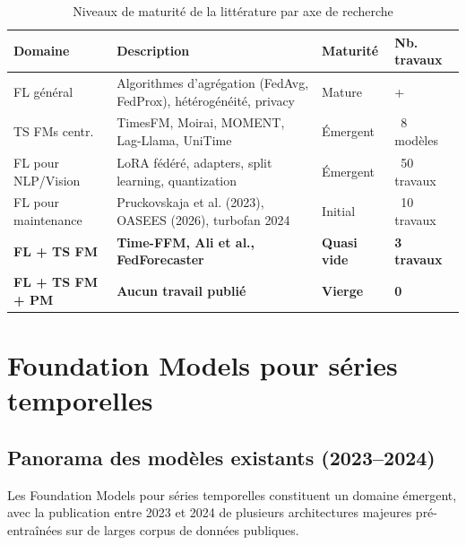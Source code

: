 \documentclass[12pt, a4paper]{report}
\begin{document}
\begin{table}[h!]
\centering
\caption{Niveaux de maturité de la littérature par axe de recherche}
\label{tab:maturity}
\renewcommand{\arraystretch}{1.6}
\begin{tabularx}{\textwidth}{>{\centering\arraybackslash}p{2.5cm}X>{\centering\arraybackslash}p{2cm}>{\centering\arraybackslash}p{2.5cm}}
\toprule
\textbf{Domaine} & \textbf{Description} & \textbf{Maturité} & \textbf{Nb. travaux} \\
\midrule
\rowcolor{mainblue!10}
FL général & Algorithmes d'agrégation (FedAvg, FedProx), hétérogénéité, privacy & Mature & 1000+ \\
\rowcolor{gaporange!10}
TS FMs centr. & TimesFM, Moirai, MOMENT, Lag-Llama, UniTime & Émergent & ~8 modèles \\
\rowcolor{gaporange!10}
FL pour NLP/Vision & LoRA fédéré, adapters, split learning, quantization & Émergent & ~50 travaux \\
\rowcolor{gapred!10}
FL pour maintenance & Pruckovskaja et al. (2023), OASEES (2026), turbofan 2024 & Initial & ~10 travaux \\
\rowcolor{gapred!20}
\textbf{FL + TS FM} & \textbf{Time-FFM, Ali et al., FedForecaster} & \textbf{Quasi vide} & \textbf{3 travaux} \\
\rowcolor{gapred!25}
\textbf{FL + TS FM + PM} & \textbf{Aucun travail publié} & \textbf{Vierge} & \textbf{0} \\
\bottomrule
\end{tabularx}
\end{table}

\section{Foundation Models pour séries temporelles}

\subsection{Panorama des modèles existants (2023--2024)}

Les Foundation Models pour séries temporelles constituent un domaine émergent, avec
la publication entre 2023 et 2024 de plusieurs architectures majeures pré-entraînées
sur de larges corpus de données publiques.
\end{document}
